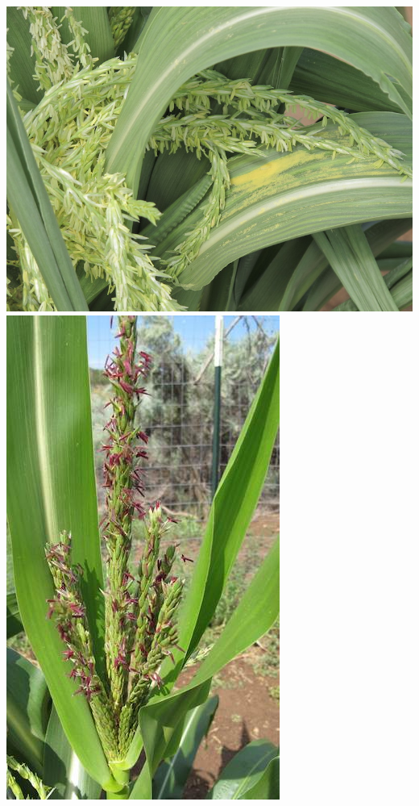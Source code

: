 \documentclass[12pt,]{article}
\begin{document}
\includegraphics{./images/growth/5_tasseling.jpg}
\includegraphics{./images/growth/6_tasseling.jpg}
\end{document}
